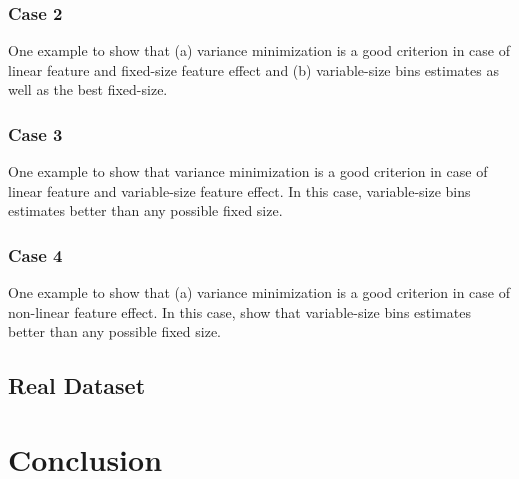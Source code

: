 \documentclass[wcp]{jmlr}
\newcommand{\1}{\mathbbm{1}}
\begin{document}
\newpage

\subsubsection{Case 2}

One example to show that (a) variance minimization is a good criterion
in case of linear feature and fixed-size feature effect and (b)
variable-size bins estimates as well as the best fixed-size.

\newpage

\subsubsection{Case 3}

One example to show that variance minimization is a good criterion in
case of linear feature and variable-size feature effect. In this case,
variable-size bins estimates better than any possible fixed size.

\newpage

\subsubsection{Case 4}

One example to show that (a) variance minimization is a good criterion
in case of non-linear feature effect. In this case, show that
variable-size bins estimates better than any possible fixed size.

\newpage

\subsection{Real Dataset}


\newpage

\section{Conclusion}
\end{document}
